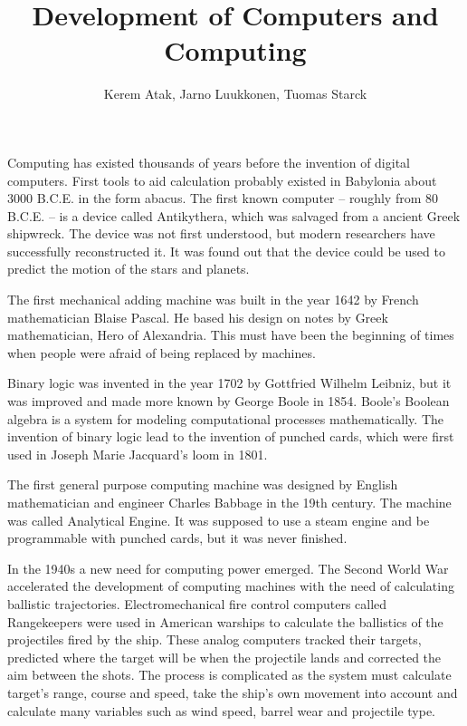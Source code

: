 \documentclass[a4paper,12pt]{article}
\begin{document}
\title{Development of Computers and Computing}
\author{Kerem Atak, Jarno Luukkonen, Tuomas Starck}
\maketitle

Computing has existed thousands of years before the invention of digital computers. First tools to aid calculation probably existed in Babylonia about 3000 B.C.E. in the form abacus.\cite{js95} The first known computer -- roughly from 80 B.C.E. -- is a device called Antikythera, which was salvaged from a ancient Greek shipwreck. The device was not first understood, but modern researchers have successfully reconstructed it. It was found out that the device could be used to predict the motion of the stars and planets.\cite{amrp}

The first mechanical adding machine was built in the year 1642 by French mathematician Blaise Pascal. He based his design on notes by Greek mathematician, Hero of Alexandria. This must have been the beginning of times when people were afraid of being replaced by machines.\cite{mh06}

Binary logic was invented in the year 1702 by Gottfried Wilhelm Leibniz, but it was improved and made more known by George Boole in 1854. Boole's Boolean algebra is a system for modeling computational processes mathematically. The invention of binary logic lead to the invention of punched cards, which were first used in Joseph Marie Jacquard's loom in 1801.

The first general purpose computing machine was designed by English mathematician and engineer Charles Babbage in the 19th century. The machine was called Analytical Engine. It was supposed to use a steam engine and be programmable with punched cards, but it was never finished.\cite{wiae}

In the 1940s a new need for computing power emerged. The Second World War accelerated the development of computing machines with the need of calculating ballistic trajectories. Electromechanical fire control computers called Rangekeepers were used in American warships to calculate the ballistics of the projectiles fired by the ship. These analog computers tracked their targets, predicted where the target will be when the projectile lands and corrected the aim between the shots. The process is complicated as the system must calculate target's range, course and speed, take the ship's own movement into account and calculate many variables such as wind speed, barrel wear and projectile type.
\end{document}
